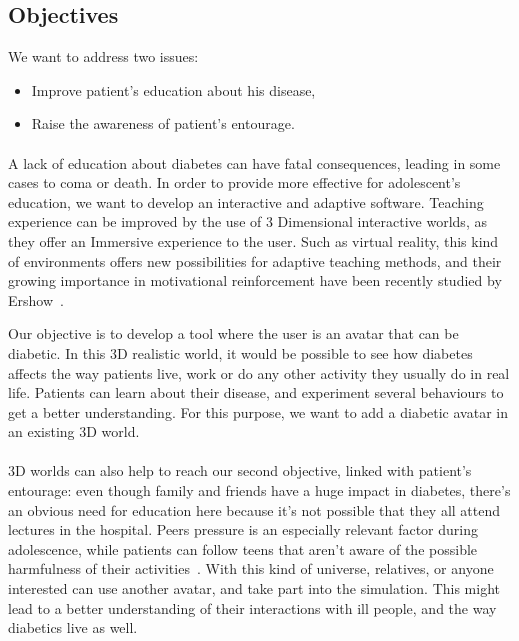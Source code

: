 \documentclass[12pt,MSc]{muthesis}
\begin{document}
\subsection{Objectives}
We want to address two issues: 
\begin{itemize}
\item Improve patient's education about his disease,
\item Raise the awareness of patient's entourage.
\end{itemize}
\paragraph{} 
A lack of education about diabetes can have fatal consequences, leading in some cases to coma or death. In order to provide more effective for adolescent's education, we want to develop an interactive and adaptive software. Teaching experience can be improved by the use of 3 Dimensional interactive worlds, as they offer an Immersive experience to the user. Such as virtual reality, this kind of environments offers new possibilities for adaptive teaching methods, and their growing importance in motivational reinforcement have been recently studied by Ershow~\cite{virtual_reality}.

Our objective is to develop a tool where the user is an avatar that can be diabetic. In this 3D realistic world, it would be possible to see how diabetes affects the way patients live, work or do any other activity they usually do in real life. Patients can learn about their disease, and experiment several behaviours to get a better understanding. For this purpose, we want to add a diabetic avatar in an existing 3D world. 

\paragraph{}
3D worlds can also help to reach our second objective, linked with patient's entourage: even though family and friends have a huge impact in diabetes, there's an obvious need for education here because it's not possible that they all attend lectures in the hospital. Peers pressure is an especially relevant factor during adolescence, while patients can follow teens that aren't aware of the possible harmfulness of their activities~\cite{relatives}.
With this kind of universe, relatives, or anyone interested can use another avatar, and take part into the simulation. This might lead to a better understanding of their interactions with ill people, and the way diabetics live as well.
\end{document}
